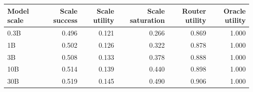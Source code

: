 \begin{tabular}{lrrrrr}
\toprule
Model scale & Scale success & Scale utility & Scale saturation & Router utility & Oracle utility \\
\midrule
0.3B & 0.496 & 0.121 & 0.266 & 0.869 & 1.000 \\
1B & 0.502 & 0.126 & 0.322 & 0.878 & 1.000 \\
3B & 0.508 & 0.133 & 0.378 & 0.888 & 1.000 \\
10B & 0.514 & 0.139 & 0.440 & 0.898 & 1.000 \\
30B & 0.519 & 0.145 & 0.490 & 0.906 & 1.000 \\
\bottomrule
\end{tabular}
